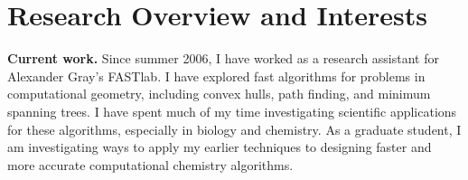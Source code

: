 \documentclass[twoside,leqno, 12pt]{article}
\date{}
\begin{document}




\section{Research Overview and Interests}
\textbf{Current work.}  Since summer 2006, I have worked as a research assistant for Alexander Gray's FASTlab.  I have explored fast algorithms for problems in computational geometry, including convex hulls, path finding, and minimum spanning trees.  I have spent much of my time investigating scientific applications for these algorithms, especially in biology and chemistry.  As a graduate student, I am investigating ways to apply my earlier techniques to designing faster and more accurate computational chemistry algorithms.  

\end{document}

